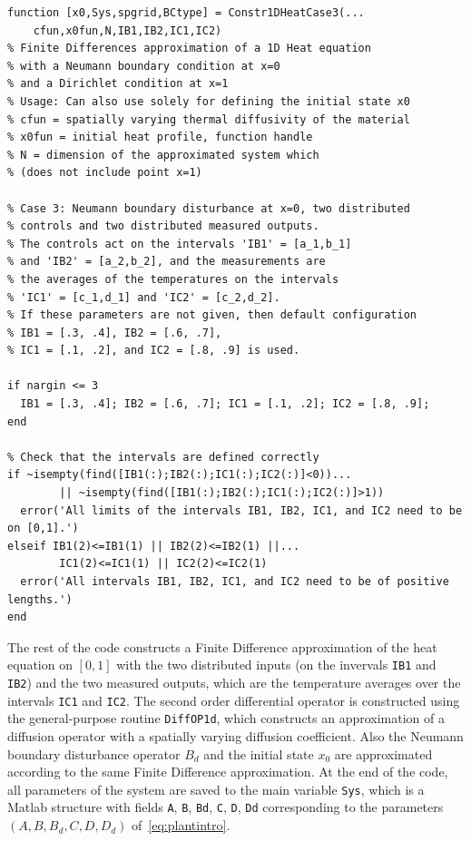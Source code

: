 \documentclass[11pt, a4paper]{amsart}
\theoremstyle{definition}
\numberwithin{equation}{section}
\begin{document}
\begin{lstlisting}
function [x0,Sys,spgrid,BCtype] = Constr1DHeatCase3(...
    cfun,x0fun,N,IB1,IB2,IC1,IC2)
% Finite Differences approximation of a 1D Heat equation
% with a Neumann boundary condition at x=0
% and a Dirichlet condition at x=1
% Usage: Can also use solely for defining the initial state x0
% cfun = spatially varying thermal diffusivity of the material
% x0fun = initial heat profile, function handle
% N = dimension of the approximated system which
% (does not include point x=1)

% Case 3: Neumann boundary disturbance at x=0, two distributed 
% controls and two distributed measured outputs.
% The controls act on the intervals 'IB1' = [a_1,b_1]
% and 'IB2' = [a_2,b_2], and the measurements are
% the averages of the temperatures on the intervals 
% 'IC1' = [c_1,d_1] and 'IC2' = [c_2,d_2].
% If these parameters are not given, then default configuration 
% IB1 = [.3, .4], IB2 = [.6, .7], 
% IC1 = [.1, .2], and IC2 = [.8, .9] is used.

if nargin <= 3
  IB1 = [.3, .4]; IB2 = [.6, .7]; IC1 = [.1, .2]; IC2 = [.8, .9];
end

% Check that the intervals are defined correctly
if ~isempty(find([IB1(:);IB2(:);IC1(:);IC2(:)]<0))...
        || ~isempty(find([IB1(:);IB2(:);IC1(:);IC2(:)]>1))
  error('All limits of the intervals IB1, IB2, IC1, and IC2 need to be on [0,1].')
elseif IB1(2)<=IB1(1) || IB2(2)<=IB2(1) ||...
        IC1(2)<=IC1(1) || IC2(2)<=IC2(1)
  error('All intervals IB1, IB2, IC1, and IC2 need to be of positive lengths.')
end
  \end{lstlisting}

The rest of the code constructs a Finite Difference approximation of the heat equation on $[0,1]$ with the two distributed inputs (on the invervals \texttt{IB1} and \texttt{IB2}) and the two measured outputs, which are the temperature averages over the intervals \texttt{IC1} and \texttt{IC2}. The second order differential operator is constructed using the general-purpose routine \texttt{DiffOP1d}, which constructs an approximation of a diffusion operator with a spatially varying diffusion coefficient.
Also the Neumann boundary disturbance operator $B_d$ and the initial state $x_0$ are approximated according to the same Finite Difference approximation. At the end of the code, all parameters of the system are saved to the main variable \texttt{Sys}, which is a Matlab structure with fields 
\texttt{A}, \texttt{B}, \texttt{Bd},  
\texttt{C}, \texttt{D}, \texttt{Dd}
corresponding to the parameters $(A,B,B_d,C,D,D_d)$ of~\eqref{eq:plantintro}.
\end{document}
